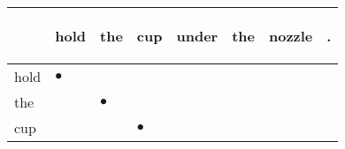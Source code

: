 \documentclass[landscape]{article}
\newcommand{\ssp}{\hspace{2pt}}
\newcommand{\mex}{\cellcolor{g}$\bullet$}
\begin{document}
\noindent\begin{tabular}{|l|p{10pt}|p{10pt}|p{10pt}|p{10pt}|p{10pt}|p{10pt}|p{10pt}|}
\hline
&\begin{sideways}\cellcolor{ref0}hold\hspace{12pt}\end{sideways}&\begin{sideways}\cellcolor{ref1}the\hspace{12pt}\end{sideways}&\begin{sideways}\cellcolor{ref2}cup\hspace{12pt}\end{sideways}&\begin{sideways}\cellcolor{ref3}under\hspace{12pt}\end{sideways}&\begin{sideways}\cellcolor{ref4}the\hspace{12pt}\end{sideways}&\begin{sideways}\cellcolor{ref5}nozzle\hspace{12pt}\end{sideways}&\begin{sideways}\cellcolor{ref6}.\hspace{12pt}\end{sideways}\\
\hline
\ssp \cellcolor{ref0}hold \ssp&\hspace{2pt}\mex&\hspace{2pt}&\hspace{2pt}&\hspace{2pt}&\hspace{2pt}&\hspace{2pt}&\hspace{2pt}\\
\hline
\ssp \cellcolor{ref1}the \ssp&\hspace{2pt}&\hspace{2pt}\mex&\hspace{2pt}&\hspace{2pt}&\hspace{2pt}&\hspace{2pt}&\hspace{2pt}\\
\hline
\ssp \cellcolor{ref2}cup \ssp&\hspace{2pt}&\hspace{2pt}&\hspace{2pt}\mex&\hspace{2pt}&\hspace{2pt}&\hspace{2pt}&\hspace{2pt}\\

\end{tabular}
\end{document}
